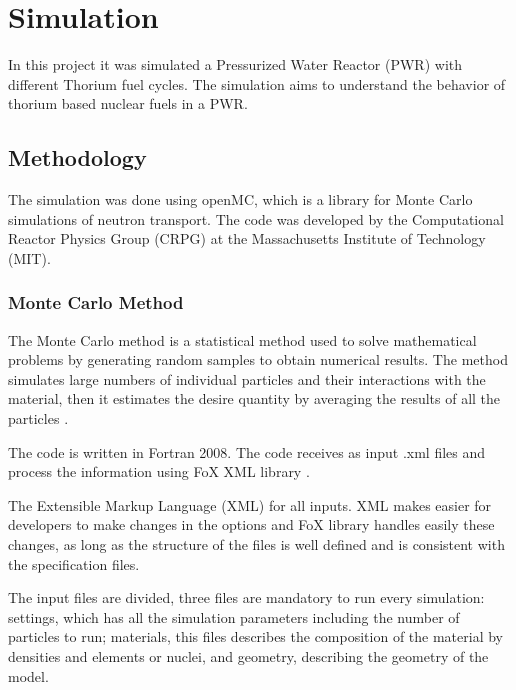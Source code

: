 \chapter{Simulation}

In this project it was simulated a Pressurized Water Reactor (PWR) with different Thorium fuel cycles. The simulation aims to understand the behavior of thorium based nuclear fuels in a PWR. 

\section{Methodology}

The simulation was done using openMC, which is a library for Monte Carlo simulations of neutron transport. The code was developed by the Computational Reactor Physics Group (CRPG) at the Massachusetts Institute of Technology (MIT). 

\subsection{Monte Carlo Method}

The Monte Carlo method is a statistical method used to solve mathematical problems by generating random samples to obtain numerical results. The method simulates large numbers of individual particles and their interactions with the material, then it estimates the desire quantity by averaging the results of all the particles \cite{TMSR_book}. 

The code is written in Fortran 2008. The code receives as input .xml files and process the information using FoX XML library \cite{OpenMC}.

The Extensible Markup Language (XML) for all inputs. XML makes easier for developers to make changes in the options and FoX library handles easily these changes, as long  as the structure of the files is well defined and is consistent with the specification files.

The input files are divided, three files are mandatory to run every simulation: settings, which has all the simulation parameters including the number of particles to run; materials, this files describes the composition of the material by densities and elements or nuclei, and geometry, describing the geometry of the model.

